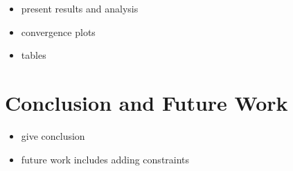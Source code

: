 \documentclass[journal]{IEEEtran}
\begin{document}
\begin{itemize}
\item present results and analysis
\item convergence plots
\item tables
\end{itemize}

\section{Conclusion and Future Work}\label{sec:conc}
\begin{itemize}
\item give conclusion
\item future work includes adding constraints
\end{itemize}






\end{document}
